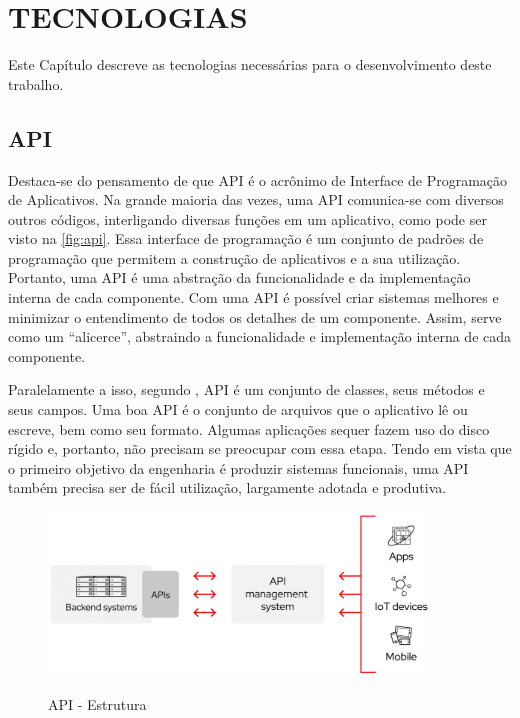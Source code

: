 
\chapter{TECNOLOGIAS}

Este Capítulo descreve as tecnologias necessárias para o desenvolvimento deste trabalho.

\section{API}
Destaca-se do pensamento de  que API é o acrônimo de Interface de Programação de Aplicativos. Na grande maioria das vezes, uma API comunica-se com diversos outros códigos, interligando diversas funções em um aplicativo, como pode ser visto na \autoref{fig:api}. Essa interface de programação é um conjunto de padrões de programação que permitem a construção de aplicativos e a sua utilização. Portanto, uma API é uma abstração da funcionalidade e da implementação interna de cada componente. Com uma API é possível criar sistemas melhores e minimizar o entendimento de todos os detalhes de um componente. Assim, serve como um “alicerce”, abstraindo a funcionalidade e implementação interna de cada componente.

Paralelamente a isso, segundo , API é um conjunto de classes, seus métodos e seus campos.
Uma boa API é o conjunto de arquivos que o aplicativo lê ou escreve, bem como seu formato. Algumas aplicações sequer fazem uso do disco rígido e, portanto, não precisam se preocupar com essa etapa. Tendo em vista que o primeiro objetivo da engenharia é produzir sistemas funcionais, uma API também precisa ser de fácil utilização, largamente adotada e produtiva. 

\begin{figure}[H]
    \centering
    \caption{API - Estrutura}
    \includegraphics[width=0.9\textwidth]{./dados/figuras/fig10}
    \label{fig:api}
\end{figure}

